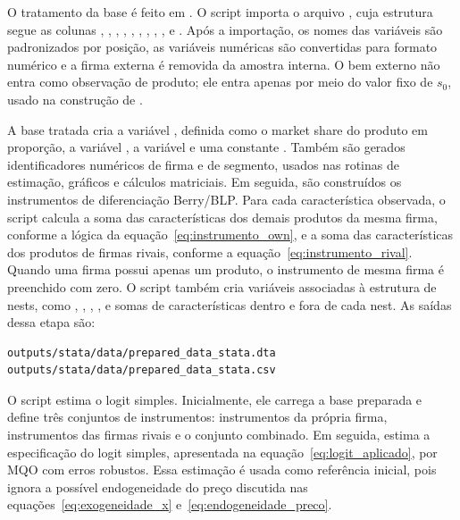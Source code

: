 \documentclass[12pt,a4paper]{article}
\begin{document}
O tratamento da base é feito em . O script importa o arquivo , cuja estrutura segue as colunas , , , , , , , , ,  e . Após a importação, os nomes das variáveis são padronizados por posição, as variáveis numéricas são convertidas para formato numérico e a firma externa  é removida da amostra interna. O bem externo não entra como observação de produto; ele entra apenas por meio do valor fixo de $s_0$, usado na construção de .

A base tratada cria a variável , definida como o market share do produto em proporção, a variável , a variável  e uma constante . Também são gerados identificadores numéricos de firma e de segmento, usados nas rotinas de estimação, gráficos e cálculos matriciais. Em seguida, são construídos os instrumentos de diferenciação Berry/BLP. Para cada característica observada, o script calcula a soma das características dos demais produtos da mesma firma, conforme a lógica da equação~\eqref{eq:instrumento_own}, e a soma das características dos produtos de firmas rivais, conforme a equação~\eqref{eq:instrumento_rival}. Quando uma firma possui apenas um produto, o instrumento de mesma firma é preenchido com zero. O script também cria variáveis associadas à estrutura de nests, como , , , ,  e somas de características dentro e fora de cada nest. As saídas dessa etapa são:

\begin{verbatim}
outputs/stata/data/prepared_data_stata.dta
outputs/stata/data/prepared_data_stata.csv
\end{verbatim}

O script  estima o logit simples. Inicialmente, ele carrega a base preparada e define três conjuntos de instrumentos: instrumentos da própria firma, instrumentos das firmas rivais e o conjunto combinado. Em seguida, estima a especificação do logit simples, apresentada na equação~\eqref{eq:logit_aplicado}, por MQO com erros robustos. Essa estimação é usada como referência inicial, pois ignora a possível endogeneidade do preço discutida nas equações~\eqref{eq:exogeneidade_x} e~\eqref{eq:endogeneidade_preco}.
\end{document}
